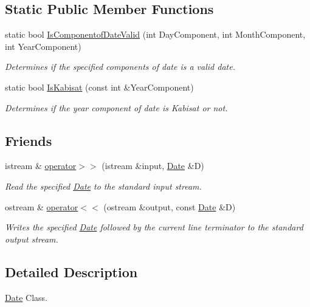 \subsection*{Static Public Member Functions}
\begin{DoxyCompactItemize}
\item 
static bool \hyperlink{class_date_a94fd42f78253556ad1e585ec473935b6}{Is\-Componentof\-Date\-Valid} (int Day\-Component, int Month\-Component, int Year\-Component)
\begin{DoxyCompactList}\small\item\em Determines if the specified components of date is a valid date. \end{DoxyCompactList}\item 
static bool \hyperlink{class_date_ae4cb2474b8a06d777264233188ed2720}{Is\-Kabisat} (const int \&Year\-Component)
\begin{DoxyCompactList}\small\item\em Determines if the year component of date is Kabisat or not. \end{DoxyCompactList}\end{DoxyCompactItemize}
\subsection*{Friends}
\begin{DoxyCompactItemize}
\item 
istream \& \hyperlink{class_date_a8576024c4c197a313e26cd753347db6c}{operator$>$$>$} (istream \&input, \hyperlink{class_date}{Date} \&D)
\begin{DoxyCompactList}\small\item\em Read the specified \hyperlink{class_date}{Date} to the standard input stream. \end{DoxyCompactList}\item 
ostream \& \hyperlink{class_date_a9559c1c3841bdae17b284844a756d4bd}{operator$<$$<$} (ostream \&output, const \hyperlink{class_date}{Date} \&D)
\begin{DoxyCompactList}\small\item\em Writes the specified \hyperlink{class_date}{Date} followed by the current line terminator to the standard output stream. \end{DoxyCompactList}\end{DoxyCompactItemize}


\subsection{Detailed Description}
\hyperlink{class_date}{Date} Class. 

